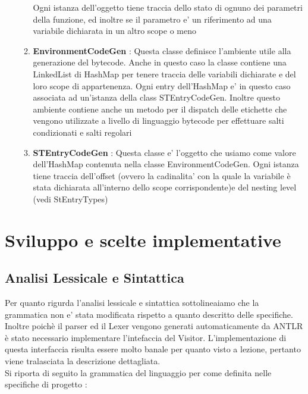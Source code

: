 \documentclass{article}
\begin{document}
\begin{itemize}
\begin{enumerate}
            Ogni istanza dell'oggetto tiene traccia dello stato di ognuno dei parametri della funzione, ed inoltre se il parametro e' un riferimento ad una variabile dichiarata in un altro scope o meno
            \item \textbf{EnvironmentCodeGen} : Questa classe definisce l'ambiente utile alla generazione del bytecode. Anche in questo caso la classe contiene una LinkedList di HashMap per tenere traccia delle variabili dichiarate e del loro scope di appartenenza. Ogni entry dell'HashMap e' in questo caso associata ad un'istanza della class STEntryCodeGen. Inoltre questo ambiente contiene anche un metodo per il dispatch delle etichette che vengono utilizzate a livello di linguaggio bytecode per effettuare salti condizionati e salti regolari
            \item \textbf{STEntryCodeGen} : Questa classe e' l'oggetto che usiamo come valore dell'HashMap contenuta nella classe EnvironmentCodeGen. Ogni istanza tiene traccia dell'offset (ovvero la cadinalita' con la quale la variabile è stata dichiarata all'interno dello scope corrispondente)e del nesting level (vedi StEntryTypes)
      \end{enumerate}
      
 \end{itemize}
 
\newpage
\section{Sviluppo e scelte implementative}
\subsection{Analisi Lessicale e Sintattica}
Per quanto rigurda l'analisi  lessicale e sintattica sottolineaiamo che la grammatica non e' stata modificata  rispetto a quanto descritto delle specifiche. Inoltre poichè il parser ed il Lexer vengono generati automaticamente da ANTLR è stato necessario implementare l'intefaccia del Visitor. L'implementazione di questa interfaccia risulta essere molto banale per quanto visto a lezione, pertanto viene tralasciata la descrizione dettagliata. \\

Si riporta di seguito la grammatica del linguaggio per come definita nelle specifiche di progetto : \\

\end{document}
